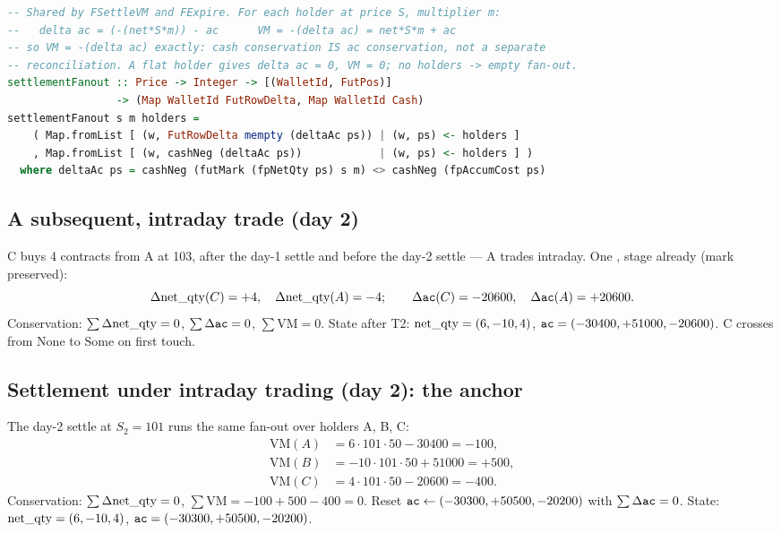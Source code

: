 \begin{lstlisting}[language=Haskell]
-- Shared by FSettleVM and FExpire. For each holder at price S, multiplier m:
--   delta ac = (-(net*S*m)) - ac      VM = -(delta ac) = net*S*m + ac
-- so VM = -(delta ac) exactly: cash conservation IS ac conservation, not a separate
-- reconciliation. A flat holder gives delta ac = 0, VM = 0; no holders -> empty fan-out.
settlementFanout :: Price -> Integer -> [(WalletId, FutPos)]
                 -> (Map WalletId FutRowDelta, Map WalletId Cash)
settlementFanout s m holders =
    ( Map.fromList [ (w, FutRowDelta mempty (deltaAc ps)) | (w, ps) <- holders ]
    , Map.fromList [ (w, cashNeg (deltaAc ps))            | (w, ps) <- holders ] )
  where deltaAc ps = cashNeg (futMark (fpNetQty ps) s m) <> cashNeg (fpAccumCost ps)
\end{lstlisting}

\subsection{A subsequent, intraday trade (day 2)}

C buys 4 contracts from A at 103, after the day-1 settle and before the day-2 settle --- A trades
intraday. One , stage already  (mark preserved):
\[
\Delta\mathrm{net\_qty}(C)=+4,\quad \Delta\mathrm{net\_qty}(A)=-4;\qquad
\Delta\texttt{ac}(C) = -20600,\quad \Delta\texttt{ac}(A) = +20600.
\]
Conservation: $\sum\Delta\mathrm{net\_qty}=0$, $\sum\Delta\texttt{ac}=0$, $\sum\mathrm{VM}=0$. State after T2:
$\mathrm{net\_qty}=(6,-10,4)$, $\texttt{ac}=(-30400,+51000,-20600)$. C crosses from $\mathrm{None}$ to $\mathrm{Some}$ on
first touch.

\subsection{Settlement under intraday trading (day 2): the anchor}
\label{sec:anchor}

{\raggedright
The day-2 settle at $S_2=101$ runs the same fan-out over holders A, B, C:
\[
\begin{aligned}
\mathrm{VM}(A) &= 6\cdot 101\cdot 50 - 30400 = -100,\\
\mathrm{VM}(B) &= -10\cdot 101\cdot 50 + 51000 = +500,\\
\mathrm{VM}(C) &= 4\cdot 101\cdot 50 - 20600 = -400.
\end{aligned}
\]
Conservation: $\sum\Delta\mathrm{net\_qty}=0$, $\sum\mathrm{VM} = -100+500-400 = 0$. Reset
$\texttt{ac}\leftarrow(-30300,+50500,-20200)$ with $\sum\Delta\texttt{ac}=0$. State: $\mathrm{net\_qty}=(6,-10,4)$,
$\texttt{ac}=(-30300,+50500,-20200)$.\par}

